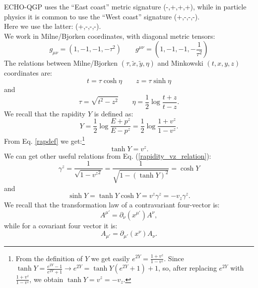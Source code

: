 \documentclass[12pt, a4paper]{report}
\begin{document}
ECHO-QGP uses the ``East coast'' metric signature (-,+,+,+), while in particle physics it is common to use the ``West coast'' signature (+,-,-,-).\\
Here we use the latter: (+,-,-,-).\\
We work in Milne/Bjorken coordinates, with diagonal metric tensors:
\begin{equation}
g_{\mu \nu}=(1,-1,-1,-\tau^2)\qquad g^{\mu \nu}=(1,-1,-1,-\frac{1}{\tau^2})
\end{equation}
The relations between Milne/Bjorken $(\tau,\tilde{x},\tilde{y},\eta)$ and Minkowski $(t,x,y,z)$ coordinates are:
\begin{equation}
t=\tau\cosh \eta \qquad z=\tau\sinh \eta
\end{equation}
and
\begin{equation}
\tau=\sqrt{t^2-z^2} \qquad \eta=\dfrac{1}{2}\log \dfrac{t+z}{t-z}.
\end{equation}
We recall that the rapidity $Y$ is defined as:
\begin{equation}
Y=\dfrac{1}{2}\log \dfrac{E+p^z}{E-p^z}=\dfrac{1}{2}\log \dfrac{1+v^z}{1-v^z}.
\label{rapdef}
\end{equation}
From Eq. \ref{rapdef} we get:\footnote{From the definition of $Y$ we get easily $e^{2Y}=\frac{1+v^z}{1-v^z}$. Since $\tanh Y=\frac{e^{2Y}-1}{e^{2Y}+1}\rightarrow e^{2Y}=\tanh Y (e^{2Y}+1) + 1$, so, after replacing $e^{2Y}$ with $\frac{1+v^z}{1-v^z}$, we obtain $\tanh Y = v^z=-v_z$.}
\begin{equation}
\tanh Y = v^z.
\label{rapidity_vz_relation}
\end{equation}
We can get other useful relations from Eq. (\ref{rapidity_vz_relation}):
\begin{equation}
\gamma^z=\frac{1}{\sqrt{1-{v^z}^2}}=\frac{1}{\sqrt{1-(\tanh Y)^2}}=\cosh Y
\label{gammaz_rel}
\end{equation}
and
\begin{equation}
\sinh Y = \tanh Y \cosh Y = v^z \gamma^z = -v_z \gamma^z.
\label{vzgammaz_rel}
\end{equation}
We recall that the transformation law of a contravariant four-vector is:
\begin{equation}
A^{\mu'}=\partial_{\nu}(x^{\mu'})A^{\nu},
\label{contra_tr}
\end{equation}
while for a covariant four vector it is:
\begin{equation}
A_{\mu'}=\partial_{\mu'}(x^{\nu})A_{\nu}.
\label{cova_tr}
\end{equation}
\end{document}
